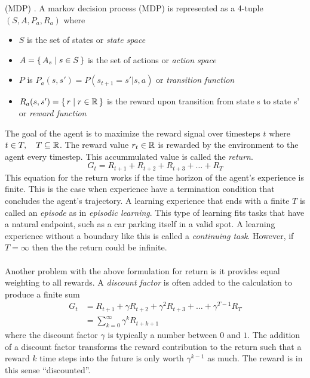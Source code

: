(MDP) \cite{Bel:57}.
A markov decision process (MDP) is represented as a 4-tuple $(S, A, P_a, R_a)$ where 
\begin{itemize}
    \item $S$ is the set of states or \textit{state space}
    \item $A=\set{A_s | s \in S}$ is the set of actions or \textit{action space}
    \item $P$ is $P_a(s, s') = P(s_{t+1} = s' | s, a)$ or \textit{transition function}
    \item $R_a(s, s')=\set{r | r \in \mathbb R}$ is the reward upon transition from state s to state s' or \textit{reward function}
\end{itemize}
The goal of the agent is to maximize the reward signal over timesteps $t$ where
$t \in T, \quad T \subseteq \mathbb R$. The reward value $r_t \in \mathbb R$ is rewarded by the 
environment to the agent every timestep.
This accummulated value is called the \textit{return}. 
\begin{equation}
    G_t = R_{t+1} + R_{t+2} + R_{t+3} + \ldots + R_{T}
\end{equation}
This equation for the return works if the time horizon of the agent's experience is finite.
This is the case when experience have a termination condition that concludes the agent's 
trajectory. A learning experience that ends with a finite $T$ is called an \textit{episode}
as in \textit{episodic learning}. This type of learning fits tasks that have a natural
endpoint, such as a car parking itself in a valid spot.
A learning experience without a boundary like this is called a \textit{continuing task}.
However, if $T = \infty$ then the the return could be infinite. \\\\
Another problem with the above formulation for return is it provides equal weighting to
all rewards. 
A \textit{discount factor} is often added to the calculation to produce a finite sum
\begin{align}
    G_t &= R_{t+1} + \gamma R_{t+2} + \gamma^{2} R_{t+3} + \ldots + \gamma^{T-1}R_{T} \\
    &= \sum_{k=0}^\infty \gamma^{k} R_{t+k+1}
\end{align}
where the discount factor $\gamma$ is typically a number between $0$ and $1$. The 
addition of a discount factor transforms the reward contribution to the return such that
a reward $k$ time steps into the future is only worth $\gamma^{k-1}$ as much. The reward
is in this sense ``discounted''. 
\\\\
